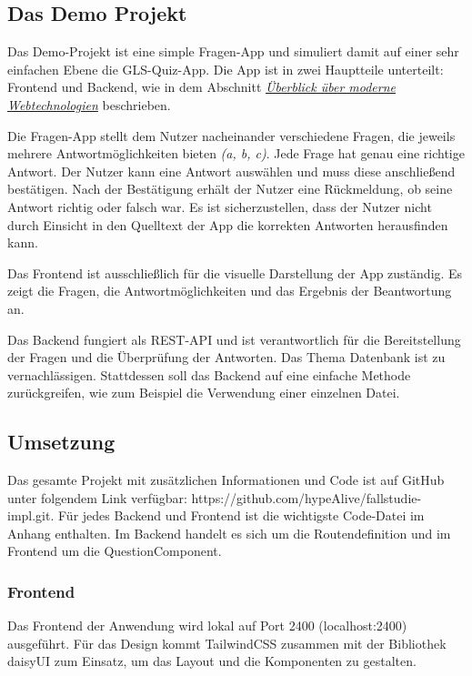 \documentclass[biblatex]{lni}
\begin{document}
\subsection{Das Demo Projekt}

Das Demo-Projekt ist eine simple Fragen-App und simuliert damit auf einer sehr einfachen Ebene die GLS-Quiz-App.
Die App ist in zwei Hauptteile unterteilt: Frontend und Backend, wie in dem Abschnitt \hyperref[sec:moderne-webtechnologien]{\textit{Überblick über moderne Webtechnologien}} beschrieben.

Die Fragen-App stellt dem Nutzer nacheinander verschiedene Fragen,
die jeweils mehrere Antwortmöglichkeiten bieten \textit{(a, b, c)}.
Jede Frage hat genau eine richtige Antwort.
Der Nutzer kann eine Antwort auswählen und muss diese anschließend bestätigen.
Nach der Bestätigung erhält der Nutzer eine Rückmeldung,
ob seine Antwort richtig oder falsch war.
Es ist sicherzustellen, dass der Nutzer nicht durch Einsicht in den Quelltext der App die korrekten Antworten herausfinden kann.

Das Frontend ist ausschließlich für die visuelle Darstellung der App zuständig.
Es zeigt die Fragen, die Antwortmöglichkeiten und das Ergebnis der Beantwortung an.

Das Backend fungiert als \ac{REST}-\ac{API} und ist verantwortlich für die Bereitstellung der Fragen und die Überprüfung der Antworten.
Das Thema Datenbank ist zu vernachlässigen.
Stattdessen soll das Backend auf eine einfache Methode zurückgreifen, wie zum Beispiel die Verwendung einer einzelnen Datei.

\subsection{Umsetzung}

Das gesamte Projekt mit zusätzlichen Informationen und Code ist auf GitHub unter folgendem Link verfügbar: https://github.com/hypeAlive/fallstudie-impl.git.
Für jedes Backend und Frontend ist die wichtigste Code-Datei im Anhang enthalten.
Im Backend handelt es sich um die Routendefinition und im Frontend um die QuestionComponent.

\subsubsection{Frontend}

Das Frontend der Anwendung wird lokal auf Port 2400 (localhost:2400) ausgeführt.
Für das Design kommt TailwindCSS zusammen mit der Bibliothek daisyUI zum Einsatz,
um das Layout und die Komponenten zu gestalten.
\end{document}
